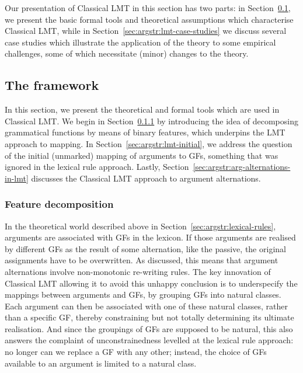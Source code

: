 \documentclass[output=paper]{langscibook}
\begin{document}
Our presentation of Classical LMT in this section has two parts: in
Section~\ref{sec:argstr:lmt-formalism}, we present the basic formal tools and
theoretical assumptions which characterise Classical LMT, while in
Section~\ref{sec:argstr:lmt-case-studies} we discuss several case studies which
illustrate the application of the theory to some empirical challenges, some of
which necessitate (minor) changes to the theory.

\subsection{The framework}
\label{sec:argstr:lmt-formalism}

In this section, we present the theoretical and formal tools which are used in
Classical LMT. We begin in Section~\ref{sec:argstr:feature-decomposition} by
introducing the idea of decomposing grammatical functions by means of binary
features, which underpins the LMT approach to mapping. In
Section~\ref{sec:argstr:lmt-initial}, we address the question of the initial (unmarked)
mapping of arguments to GFs, something that was ignored in the lexical rule
approach. Lastly, Section~\ref{sec:argstr:arg-alternations-in-lmt} discusses the
Classical LMT approach to argument alternations.

\subsubsection{Feature decomposition}\label{sec:argstr:feature-decomposition}

In the theoretical world described above in Section~\ref{sec:argstr:lexical-rules},
arguments are associated with GFs in the lexicon. If those arguments are
realised by different GFs as the result of some alternation, like the passive,
the original assignments have to be overwritten. As discussed, this means that
argument alternations involve non-monotonic re-writing rules. The key innovation
of Classical LMT allowing it to avoid this unhappy conclusion is to underspecify
the mappings between arguments and GFs, by grouping GFs into natural classes.
Each argument can then be associated with one of these natural classes, rather
than a specific GF, thereby constraining but not totally determining its
ultimate realisation. And since the groupings of GFs are supposed to be natural,
this also answers the complaint of unconstrainedness levelled at the lexical
rule approach: no longer can we replace a GF with any other; instead, the choice
of GFs available to an argument is limited to a natural class.
\end{document}
